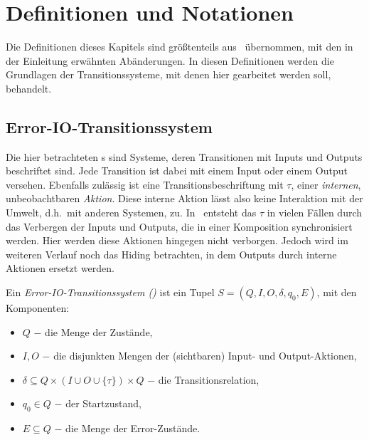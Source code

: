 \chapter{Definitionen und Notationen}

Die Definitionen dieses Kapitels sind größtenteils aus~\cite{Vogler2014EIO}
übernommen, mit den in der Einleitung erwähnten Abänderungen. In diesen
Definitionen werden die Grundlagen der Transitionssysteme, mit denen hier
gearbeitet werden soll, behandelt.

\section{Error-IO-Transitionssystem}
Die hier betrachteten \EIO{}s sind Systeme, deren Transitionen mit Inputs und
Outputs beschriftet sind. Jede Transition ist dabei mit einem Input oder einem
Output versehen. Ebenfalls zulässig ist eine Transitionsbeschriftung mit
$\tau$, einer \emph{internen}, unbeobachtbaren \emph{Aktion}. Diese interne
Aktion lässt also keine Interaktion mit der Umwelt, d.h.\ mit anderen Systemen,
zu. In~\cite{Vogler2014EIO} entsteht das $\tau$ in vielen Fällen durch das
Verbergen der Inputs und Outputs, die in einer Komposition synchronisiert
werden. Hier werden diese Aktionen hingegen nicht verborgen. Jedoch wird im
weiteren Verlauf noch das Hiding betrachten, in dem Outputs durch interne
Aktionen ersetzt werden.

\begin{Def}
  Ein \emph{Error-IO-Transitionssystem \linebreak (\EIO{})} ist
  ein Tupel $S=(Q,I,O,\delta, q_0, E)$, mit den Komponenten:
  \begin{itemize}
    \item $Q$ $-$ die Menge der Zustände,
    \item $I,O$ $-$ die disjunkten Mengen der (sichtbaren) Input- und
      Output-Aktionen,
    \item $\delta\subseteq Q\times (I\cup O\cup\{\tau\})\times Q$ $-$ die
      Transitionsrelation,
    \item $q_0\in Q$ $-$ der Startzustand,
    \item $E\subseteq Q$ $-$ die Menge der Error-Zustände.
  \end{itemize}
\end{Def}

